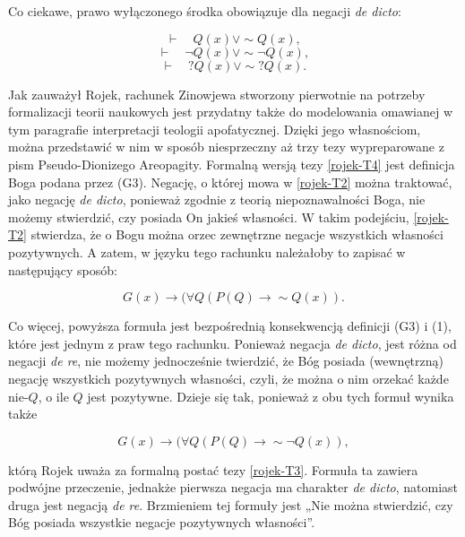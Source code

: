 Co ciekawe, prawo wyłączonego środka obowiązuje dla negacji \textit{de
dicto}:

\begin{equation}
    \vdash \quad Q(x) \lor  \sim\! Q(x),
\end{equation}
\begin{equation}
    \vdash \quad \neg Q(x) \lor  \sim\! \neg Q(x),
\end{equation}
\begin{equation}
\vdash \quad ?Q(x) \lor  \sim\! ?Q(x).
\end{equation}

Jak zauważył Rojek, rachunek Zinowjewa stworzony pierwotnie na potrzeby
formalizacji teorii naukowych jest przydatny także do modelowania
omawianej w tym paragrafie interpretacji teologii apofatycznej. Dzięki
jego własnościom, można przedstawić w nim w sposób niesprzeczny aż trzy
tezy wypreparowane z pism Pseudo-Dionizego Areopagity. Formalną wersją
tezy \eqref{rojek-T4} jest definicja Boga podana przez (G3). Negację, o której mowa
w \eqref{rojek-T2} można traktować, jako negację \textit{de dicto}, ponieważ
zgodnie z teorią niepoznawalności Boga, nie możemy stwierdzić, czy
posiada On jakieś własności. W takim podejściu, \eqref{rojek-T2} stwierdza, że o
Bogu można orzec zewnętrzne negacje wszystkich własności pozytywnych. A
zatem, w języku tego rachunku należałoby to zapisać w następujący sposób:



\begin{equation}
    G(x) \to  (\forall Q (P(Q) \to  \sim\!Q(x)).
\end{equation}



Co więcej, powyższa formuła jest bezpośrednią konsekwencją definicji
(G3) i (1), które jest jednym z praw tego rachunku. Ponieważ negacja
\textit{de dicto}, jest różna od negacji \textit{de re}, nie możemy
jednocześnie twierdzić, że Bóg posiada (wewnętrzną) negację wszystkich
pozytywnych własności, czyli, że można o nim orzekać każde nie-$Q$, o ile
$Q$ jest pozytywne. Dzieje się tak, ponieważ z obu tych formuł wynika
także


\begin{equation}
    G(x) \to  (\forall Q (P(Q) \to
\sim\!\neg Q(x)),
\end{equation}


którą Rojek uważa za formalną postać tezy \eqref{rojek-T3}. Formuła ta zawiera
podwójne przeczenie, jednakże pierwsza negacja ma charakter \textit{de
dicto}, natomiast druga jest negacją \textit{de re}. Brzmieniem tej
formuły jest „Nie można stwierdzić, czy Bóg posiada wszystkie negacje
pozytywnych własności”.

